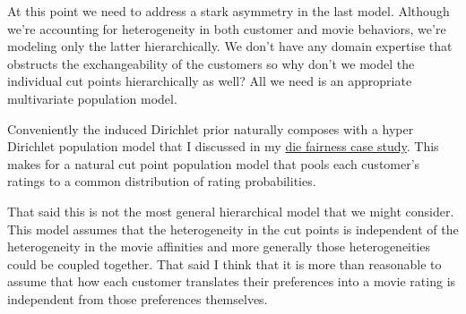 \documentclass[
  letterpaper,
  DIV=11,
  numbers=noendperiod]{scrartcl}
\begin{document}
At this point we need to address a stark asymmetry in the last model.
Although we're accounting for heterogeneity in both customer and movie
behaviors, we're modeling only the latter hierarchically. We don't have
any domain expertise that obstructs the exchangeability of the customers
so why don't we model the individual cut points hierarchically as well?
All we need is an appropriate multivariate population model.

Conveniently the induced Dirichlet prior naturally composes with a hyper
Dirichlet population model that I discussed in my
\href{https://betanalpha.github.io/assets/chapters_html/die_fairness.html}{die
fairness case study}. This makes for a natural cut point population
model that pools each customer's ratings to a common distribution of
rating probabilities.

That said this is not the most general hierarchical model that we might
consider. This model assumes that the heterogeneity in the cut points is
independent of the heterogeneity in the movie affinities and more
generally those heterogeneities could be coupled together. That said I
think that it is more than reasonable to assume that how each customer
translates their preferences into a movie rating is independent from
those preferences themselves.
\end{document}
